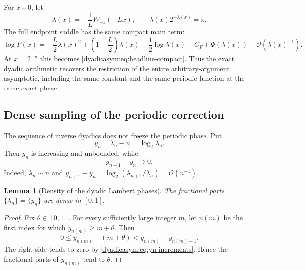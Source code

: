 \documentclass[11pt,oneside]{article}
\newtheorem{lemma}[lemma]{Lemma}
\theoremstyle{definition}
\theoremstyle{remark}
\newcommand{\bigO}{\mathcal O}
\begin{document}
For $x\downarrow0$, let
\begin{equation}
 \lambda(x)=-\frac1L W_{-1}(-Lx),
 \qquad
 \lambda(x)2^{-\lambda(x)}=x.                              \label{dyadicasym:eq:lambda-x}
\end{equation}
The full endpoint saddle has the same compact main term:
\begin{equation}
 \log F(x)=
 -\frac L2\lambda(x)^2+
 \left(1+\frac L2\right)\lambda(x)-\frac12\log\lambda(x)
 +C_F+\Psi(\lambda(x))+\bigO(\lambda(x)^{-1}).              \label{dyadicasym:eq:general-x-main}
\end{equation}
At $x=2^{-n}$ this becomes \eqref{dyadicasym:eq:headline-compact}.  Thus the exact dyadic arithmetic
recovers the restriction of the entire arbitrary-argument asymptotic, including the same
constant and the same periodic function at the same exact phase.

\subsection{Dense sampling of the periodic correction}

The sequence of inverse dyadics does not freeze the periodic phase.  Put
\begin{equation}
 y_n=\lambda_n-n=\log_2\lambda_n.                           \label{dyadicasym:eq:yn}
\end{equation}
Then $y_n$ is increasing and unbounded, while
\begin{equation}
 y_{n+1}-y_n\longrightarrow0.                               \label{dyadicasym:eq:yn-increments}
\end{equation}
Indeed, $\lambda_n\sim n$ and
$y_{n+1}-y_n=\log_2(\lambda_{n+1}/\lambda_n)=\bigO(n^{-1})$.

\begin{lemma}[Density of the dyadic Lambert phases]
\label{dyadicasym:lem:phase-density}
The fractional parts $\{\lambda_n\}=\{y_n\}$ are dense in $[0,1]$.
\end{lemma}

\begin{proof}
Fix $\theta\in[0,1]$.  For every sufficiently large integer $m$, let $n(m)$ be the first
index for which $y_{n(m)}\ge m+\theta$.  Then
\begin{equation*}
 0\le y_{n(m)}-(m+\theta)
 <y_{n(m)}-y_{n(m)-1}.
\end{equation*}
The right side tends to zero by \eqref{dyadicasym:eq:yn-increments}.  Hence the fractional parts of
$y_{n(m)}$ tend to $\theta$.
\end{proof}
\end{document}
